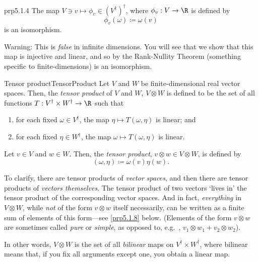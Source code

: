 \begin{prp}{}{prp5.1.4}
The map $V\ni v\mapsto \phi _v\in (V^\dagger )^\dagger$, where $\phi _v:V\rightarrow \R$ is defined by
\begin{equation}
\phi _v(\omega )\coloneqq \omega (v)
\end{equation}
is an isomorphism.
\begin{wrn}
Warning:  This is \emph{false} in infinite dimensions.  You will see that we show that this map is injective and linear, and so by the Rank-Nullity Theorem (something specific to finite-dimensions) is an isomorphism.
\end{wrn}
\end{prp}
\begin{dfn}{Tensor product}{TensorProduct}
Let $V$ and $W$ be finite-dimensional real vector spaces.  Then, the \emph{tensor product} of $V$ and $W$, $V\otimes W$ is defined to be the set of all functions $T:V^{\dagger}\times W^{\dagger}\rightarrow \R$ such that
\begin{enumerate}
\item for each fixed $\omega \in V^{\dagger}$, the map $\eta \mapsto T(\omega ,\eta )$ is linear; and
\item for each fixed $\eta \in W^{\dagger}$, the map $\omega \mapsto T(\omega ,\eta )$ is linear.
\end{enumerate}
Let $v\in V$ and $w\in W$.  Then, the \emph{tensor product}, $v\otimes w\in V\otimes W$, is defined by
\begin{equation}
[v\otimes w](\omega ,\eta )\coloneqq \omega (v)\eta (w).
\end{equation}
\begin{rmk}
To clarify, there are tensor products of \emph{vector spaces}, and then there are tensor products of \emph{vectors themselves}.  The tensor product of two vectors `lives in' the tensor product of the corresponding vector spaces.  And in fact, \emph{everything} in $V\otimes W$, while \emph{not} of the form $v\otimes w$ itself necessarily, can be written as a finite sum of elements of this form---see \cref{prp5.1.8} below.  (Elements of the form $v\otimes w$ are sometimes called \emph{pure} or \emph{simple}, as opposed to, e.g.~, $v_1\otimes w_1+v_2\otimes w_2$).
\end{rmk}
\begin{rmk}
In other words, $V\otimes W$ is the set of all \emph{bilinear} maps on $V^{\dagger}\times W^{\dagger}$, where bilinear means that, if you fix all arguments except one, you obtain a linear map.

\end{rmk}
\end{dfn}
